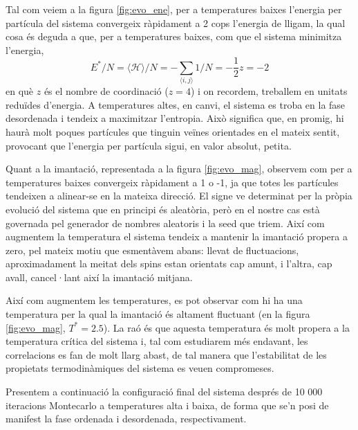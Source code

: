 \documentclass[a4paper]{article}
\begin{document}
Tal com veiem a la figura \ref{fig:evo_ene}, per a temperatures baixes l'energia per partícula del sistema convergeix ràpidament a 2 cops l'energia de lligam, la qual cosa és deguda a que, per a temperatures baixes, com que el sistema minimitza l'energia,
\begin{equation*}
    E^*/N = \langle \mathcal{H} \rangle / N= -\sum_{\langle{i,j\rangle}} 1/N = -\frac{1}{2}z = -2
\end{equation*}
en què $z$ és el nombre de coordinació ($z=4$) i on recordem, treballem en unitats reduïdes d'energia. A temperatures altes, en canvi, el sistema es troba en la fase desordenada i tendeix a maximitzar l'entropia. Això significa que, en promig, hi haurà molt poques partícules que tinguin veïnes orientades en el mateix sentit, provocant que l'energia per partícula sigui, en valor absolut, petita.

Quant a la imantació, representada a la figura \ref{fig:evo_mag}, observem com per a temperatures baixes convergeix ràpidament a 1 o -1, ja que totes les partícules tendeixen a alinear-se en la mateixa direcció. El signe ve determinat per la pròpia evolució del sistema que en principi és aleatòria, però en el nostre cas està governada pel generador de nombres aleatoris i la seed que triem. Així com augmentem la temperatura el sistema tendeix a mantenir la imantació propera a zero, pel mateix motiu que esmentàvem abans: llevat de fluctuacions, aproximadament la meitat dels spins estan orientats cap amunt, i l'altra, cap avall, cancel·lant així la imantació mitjana.

Així com augmentem les temperatures, es pot observar com hi ha una temperatura per la qual la imantació és altament fluctuant (en la figura \ref{fig:evo_mag}, $T^*=2.5$). La raó és que aquesta temperatura és molt propera a la temperatura crítica del sistema i, tal com estudiarem més endavant, les correlacions es fan de molt llarg abast, de tal manera que l'estabilitat de les propietats termodinàmiques del sistema es veuen compromeses.

Presentem a continuació la configuració final del sistema després de 10 000 iteracions Montecarlo a temperatures alta i baixa, de forma que se'n posi de manifest la fase ordenada i desordenada, respectivament.
\end{document}
